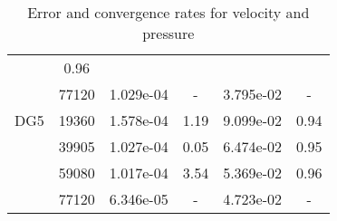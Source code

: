 \begin{table}
\begin{center}
{\begin{tabular}{| l | c | c | c | c | c |}
                &0.96\\
                
            &77120
            
                &1.029e-04
                
                &-
                
                &3.795e-02
                
                &-\\
                \hline
        \hline
        \hspace{0.1cm}DG5\hspace{0.1cm}    
        
            &19360
            
                &1.578e-04
                
                &1.19
                
                &9.099e-02
                
                &0.94\\
                
            &39905
            
                &1.027e-04
                
                &0.05
                
                &6.474e-02
                
                &0.95\\
                
            &59080
            
                &1.017e-04
                
                &3.54
                
                &5.369e-02
                
                &0.96\\
                
            &77120
            
                &6.346e-05
                
                &-
                
                &4.723e-02
                
                &-\\
                \hline\end{tabular}}
    \end{center}
    \caption{Error and convergence rates for velocity and pressure}
    \label{tab:conv}
    \end{table}
